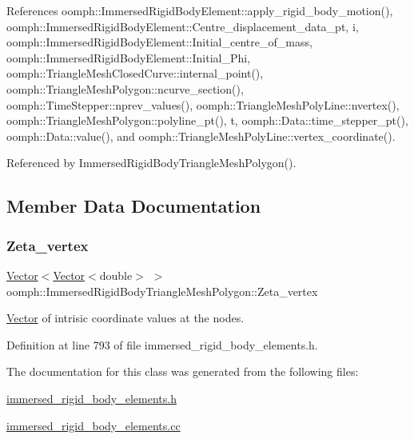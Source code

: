 References oomph\+::\+Immersed\+Rigid\+Body\+Element\+::apply\+\_\+rigid\+\_\+body\+\_\+motion(), oomph\+::\+Immersed\+Rigid\+Body\+Element\+::\+Centre\+\_\+displacement\+\_\+data\+\_\+pt, i, oomph\+::\+Immersed\+Rigid\+Body\+Element\+::\+Initial\+\_\+centre\+\_\+of\+\_\+mass, oomph\+::\+Immersed\+Rigid\+Body\+Element\+::\+Initial\+\_\+\+Phi, oomph\+::\+Triangle\+Mesh\+Closed\+Curve\+::internal\+\_\+point(), oomph\+::\+Triangle\+Mesh\+Polygon\+::ncurve\+\_\+section(), oomph\+::\+Time\+Stepper\+::nprev\+\_\+values(), oomph\+::\+Triangle\+Mesh\+Poly\+Line\+::nvertex(), oomph\+::\+Triangle\+Mesh\+Polygon\+::polyline\+\_\+pt(), t, oomph\+::\+Data\+::time\+\_\+stepper\+\_\+pt(), oomph\+::\+Data\+::value(), and oomph\+::\+Triangle\+Mesh\+Poly\+Line\+::vertex\+\_\+coordinate().



Referenced by Immersed\+Rigid\+Body\+Triangle\+Mesh\+Polygon().



\subsection{Member Data Documentation}
\mbox{\label{classoomph_1_1ImmersedRigidBodyTriangleMeshPolygon_a4e5febe00eb1c571d703361792825288}} 
\subsubsection{\texorpdfstring{Zeta\+\_\+vertex}{Zeta\_vertex}}
{\footnotesize\ttfamily \hyperlink{classoomph_1_1Vector}{Vector}$<$\hyperlink{classoomph_1_1Vector}{Vector}$<$double$>$ $>$ oomph\+::\+Immersed\+Rigid\+Body\+Triangle\+Mesh\+Polygon\+::\+Zeta\+\_\+vertex\hspace{0.3cm}{\ttfamily [private]}}



\hyperlink{classoomph_1_1Vector}{Vector} of intrisic coordinate values at the nodes. 



Definition at line 793 of file immersed\+\_\+rigid\+\_\+body\+\_\+elements.\+h.



The documentation for this class was generated from the following files\+:\begin{DoxyCompactItemize}
\item 
\hyperlink{immersed__rigid__body__elements_8h}{immersed\+\_\+rigid\+\_\+body\+\_\+elements.\+h}\item 
\hyperlink{immersed__rigid__body__elements_8cc}{immersed\+\_\+rigid\+\_\+body\+\_\+elements.\+cc}\end{DoxyCompactItemize}
